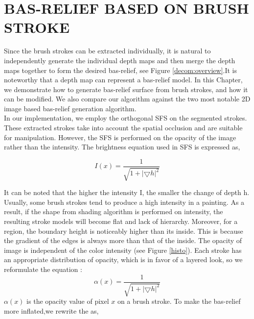 \chapter{BAS-RELIEF BASED ON BRUSH STROKE }
Since the brush strokes can be extracted individually, it is natural to independently generate the individual depth maps and then merge the depth maps together to form the desired bas-relief, see Figure \ref{decom:overview}.It is noteworthy that a depth map can represent a bas-relief model.   In this Chapter, we demonstrate how to generate bas-relief surface from brush strokes, and how it can be modified. We also compare our algorithm against the two most notable 2D image based bas-relief generation algorithm. \\

 In our implementation, we employ the orthogonal SFS \cite{prados2004unifying} on the segmented strokes. These extracted strokes take into account the spatial occlusion and are suitable for manipulation. However, the SFS is performed on the opacity of the image rather than the intensity. The brightness equation used in SFS is expressed as,

\begin{equation*}
I(x)=\frac{1}{\sqrt{1+\lvert \bigtriangledown h \rvert ^2}}
\end{equation*}

It can be noted that the higher the intensity I, the smaller the change of depth h. Usually, some brush strokes tend to produce a high intensity in a painting. As a result, if the shape from shading algorithm is performed on intensity, the resulting stroke models will become flat and lack of hierarchy. Moreover, for a region, the boundary height is noticeably higher than its inside. This is because the gradient of the edges is always more than that of the inside. The opacity of image is independent of the color intensity (see Figure \ref{histo}). Each stroke has an appropriate distribution of opacity, which is in favor of a layered look, so we reformulate the equation : 
\begin{equation*}
\alpha(x)=\frac{1}{\sqrt{1+\lvert \bigtriangledown h \rvert ^2}}
\end{equation*}
$\alpha(x)$ is the opacity value of pixel $x$ on a brush stroke. 
To make the bas-relief more inflated,we rewrite the as,

